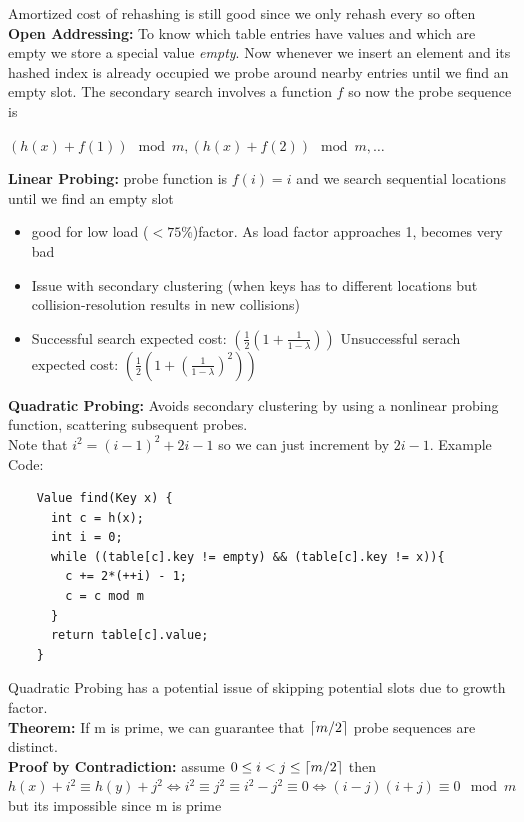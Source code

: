 \documentclass{article}
\DeclarePairedDelimiter{\ceil}{\lceil}{\rceil}
\begin{document}
  Amortized cost of rehashing is still good since we only rehash every so often \\ 
  \textbf{Open Addressing: }To know which table entries have values and which are empty we store a special value \textit{empty}. Now whenever we insert an element and its hashed index is already occupied we probe around nearby entries until we find an empty slot. The secondary search involves a function $f$ so now the probe sequence is
  \begin{center}
    $(h(x) + f(1)) \mod m, (h(x) + f(2)) \mod m, \ldots$
  \end{center}
  \newpage
  \noindent \textbf{Linear Probing: }probe function is $f(i) = i$ and we search sequential locations until we find an empty slot
  \begin{itemize}[noitemsep]
    \item good for low load ($<75\%$)factor. As load factor approaches 1, becomes very bad
    \item Issue with secondary clustering (when keys has to different locations but collision-resolution results in new collisions)
    \item Successful search expected cost: $(\frac{1}{2}(1 + \frac{1}{1 - \lambda}))$ \quad Unsuccessful serach expected cost: $(\frac{1}{2}(1 + (\frac{1}{1 - \lambda})^{2}))$ \\
  \end{itemize}
  \textbf{Quadratic Probing: }Avoids secondary clustering by using a nonlinear probing function, scattering subsequent probes. \\
  Note that $i^{2} = (i-1)^{2} + 2i - 1$ so we can just increment by $2i - 1$. Example Code:
  \begin{lstlisting}
    Value find(Key x) {
      int c = h(x);
      int i = 0;
      while ((table[c].key != empty) && (table[c].key != x)){
        c += 2*(++i) - 1;
        c = c mod m
      }
      return table[c].value;
    }
  \end{lstlisting}
  Quadratic Probing has a potential issue of skipping potential slots due to growth factor. \\
  \textbf{Theorem: }If m is prime, we can guarantee that $\ceil{m/2}$ probe sequences are distinct.\\
  \textbf{Proof by Contradiction: }assume $0 \leq i < j \leq \ceil{m/2}$ then \\
  $h(x) + i^{2} \equiv h(y) + j^{2} \iff i^{2} \equiv j^{2} \equiv i^{2} - j^{2} \equiv 0 \iff (i-j)(i+j) \equiv 0 \mod m$ but its impossible since m is prime\\
\end{document}
